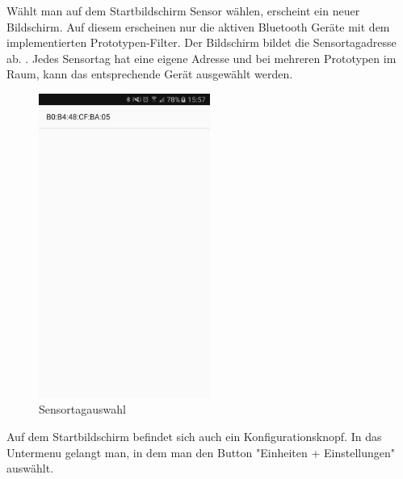 Wählt man auf dem Startbildschirm \glqq Sensor wählen\grqq,  erscheint ein neuer Bildschirm. Auf diesem erscheinen nur die aktiven Bluetooth Geräte mit dem implementierten Prototypen-Filter. Der Bildschirm bildet die Sensortagadresse ab. . Jedes Sensortag hat eine eigene Adresse und bei mehreren Prototypen im Raum, kann das entsprechende Gerät ausgewählt werden.


\begin{figure}[ht]
    \includegraphics[width=0.5\textwidth]{4Resultate/imag/BLEAdresseAuswaehlen.png} 
    \caption{Sensortagauswahl}
    \label{sensorauswahl}
\end{figure}

Auf dem Startbildschirm befindet sich auch ein Konfigurationsknopf. In das Untermenu gelangt man, in dem man den Button "Einheiten + Einstellungen" auswählt.

